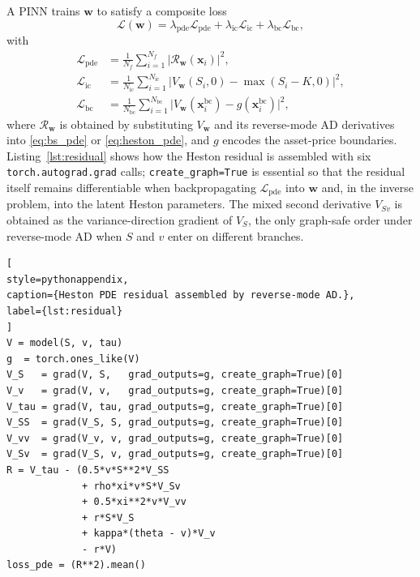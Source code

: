 A PINN trains $\boldsymbol{w}$ to satisfy a composite loss \parencite{raissi2019physics,raissi2017physics1}
\begin{equation}\label{eq:pinn_loss}
    \mathcal{L}(\boldsymbol{w})=\lambda_{\mathrm{pde}}\mathcal{L}_{\mathrm{pde}}+\lambda_{\mathrm{ic}}\mathcal{L}_{\mathrm{ic}}+\lambda_{\mathrm{bc}}\mathcal{L}_{\mathrm{bc}},
\end{equation}
with
\begin{align}
    \mathcal{L}_{\mathrm{pde}} &= \frac{1}{N_f}\sum_{i=1}^{N_f}\big|\mathcal{R}_{\boldsymbol{w}}(\mathbf{x}_i)\big|^2,\\
    \mathcal{L}_{\mathrm{ic}}  &= \frac{1}{N_{\mathrm{ic}}}\sum_{i=1}^{N_{\mathrm{ic}}}\big|V_{\boldsymbol{w}}(S_i,0)-\max(S_i-K,0)\big|^2,\\
    \mathcal{L}_{\mathrm{bc}}  &= \frac{1}{N_{\mathrm{bc}}}\sum_{i=1}^{N_{\mathrm{bc}}}\big|V_{\boldsymbol{w}}(\mathbf{x}^{\mathrm{bc}}_i)-g(\mathbf{x}^{\mathrm{bc}}_i)\big|^2,
\end{align}
where $\mathcal{R}_{\boldsymbol{w}}$ is obtained by substituting $V_{\boldsymbol{w}}$ and its reverse-mode AD derivatives \parencite{baydin2018automatic} into \eqref{eq:bs_pde} or \eqref{eq:heston_pde}, and $g$ encodes the asset-price boundaries. Listing~\ref{lst:residual} shows how the Heston residual is assembled with six \texttt{torch.autograd.grad} calls; \texttt{create\_graph=True} is essential so that the residual itself remains differentiable when backpropagating $\mathcal{L}_{\mathrm{pde}}$ into $\boldsymbol{w}$ and, in the inverse problem, into the latent Heston parameters. The mixed second derivative $V_{Sv}$ is obtained as the variance-direction gradient of $V_S$, the only graph-safe order under reverse-mode AD when $S$ and $v$ enter on different branches.

\begin{lstlisting}[
style=pythonappendix,
caption={Heston PDE residual assembled by reverse-mode AD.},
label={lst:residual}
]
V = model(S, v, tau)
g  = torch.ones_like(V)
V_S   = grad(V, S,   grad_outputs=g, create_graph=True)[0]
V_v   = grad(V, v,   grad_outputs=g, create_graph=True)[0]
V_tau = grad(V, tau, grad_outputs=g, create_graph=True)[0]
V_SS  = grad(V_S, S, grad_outputs=g, create_graph=True)[0]
V_vv  = grad(V_v, v, grad_outputs=g, create_graph=True)[0]
V_Sv  = grad(V_S, v, grad_outputs=g, create_graph=True)[0]
R = V_tau - (0.5*v*S**2*V_SS
             + rho*xi*v*S*V_Sv
             + 0.5*xi**2*v*V_vv
             + r*S*V_S
             + kappa*(theta - v)*V_v
             - r*V)
loss_pde = (R**2).mean()
\end{lstlisting}

